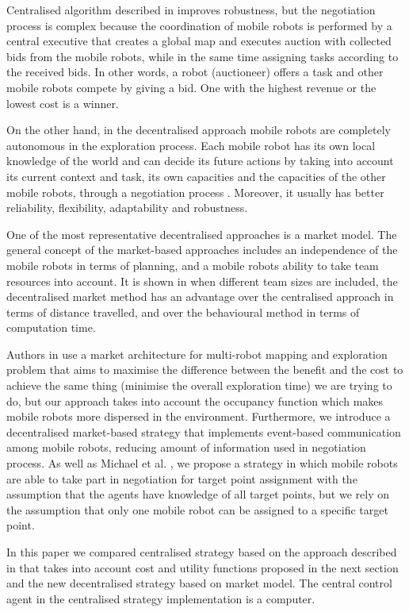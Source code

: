 \documentclass[letterpaper, 10 pt, conference]{ieeeconf}  %
\begin{document}
Centralised algorithm described in \cite{burgard} improves robustness, but the negotiation process is complex because the coordination of mobile robots is performed by a central executive that creates a global map and executes auction with collected bids from the mobile robots, while in the same time assigning tasks according to the received bids. In other words, a robot (auctioneer) offers a task and other mobile robots compete by giving a bid. One with the highest revenue or the lowest cost is a winner. 

On the other hand, in the decentralised approach mobile robots are completely autonomous in the exploration process. Each mobile robot has its own local knowledge of the world and can decide its future actions by taking into account its current context and task, its own capacities and the capacities of the other mobile robots, through a negotiation process \cite{Yan}. Moreover, it usually has better reliability, flexibility, adaptability and robustness. 

One of the most representative decentralised approaches is a market model.
The general concept of the market-based approaches includes an independence of the mobile robots in terms of planning, and a mobile robots ability to take team resources into account. It is shown in \cite{usporedba} when different team sizes are included, the decentralised market method has an advantage over the centralised approach in terms of distance travelled, and over the behavioural method \cite{behavioural} in terms of computation time.

Authors in \cite{market-economy} use a market architecture for multi-robot mapping and exploration problem that aims to maximise the difference between the benefit and the cost to achieve the same thing (minimise the overall exploration time) we are trying to do, but our approach takes into account the occupancy function which makes mobile robots more dispersed in the environment. Furthermore, we introduce a decentralised market-based strategy that implements event-based communication among mobile robots, reducing amount of information used in negotiation process. As well as Michael et al. \cite{Michael}, we propose a strategy in which mobile robots are able to take part in negotiation for target point assignment with the assumption that the agents have knowledge of all target points, but we rely on the assumption that only one mobile robot can be assigned to a specific target point.  

In this paper we compared centralised strategy based on the approach described in \cite{burgard} that takes into account cost and utility functions proposed in the next section and the new decentralised strategy based on market model. The central control agent in the centralised strategy implementation  is a computer.
\end{document}
